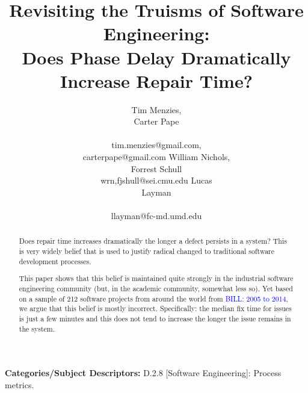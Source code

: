 \documentclass{sig-alternate}
\newcommand{\bill}[1]{\textcolor{blue}{BILL: #1}}
\begin{document}
\title{Revisiting the Truisms of Software Engineering:\\ Does Phase Delay Dramatically Increase  Repair Time?}
\author{
\alignauthor
Tim Menzies, \\Carter Pape\\
       \\
       tim.menzies@gmail.com,\\carterpape@gmail.com
\alignauthor
William Nichols,\\ Forrest Schull\\
wrn,fjshull@sei.cmu.edu
\alignauthor
Lucas \\Layman\\
       \\ 
       llayman@fc-md.umd.edu
} 


 
\maketitle
\begin{abstract}
Does
repair time increases dramatically
the longer a defect persists in a system?
This  is very widely belief that is used to justify 
radical changed to    traditional software development
 processes.

This paper shows that this belief is maintained
quite strongly in the industrial software engineering
community (but, in the academic community, somewhat less so).
Yet based on a sample of 
212 software projects from around the world from 
\bill{2005 to 2014}, we argue that this belief is mostly 
incorrect. Specifically: the median fix time for issues
is just a few minutes and this does not tend to increase
the longer the issue remains in the system. 

\end{abstract}

\vspace{1mm}
\noindent
{\bf Categories/Subject Descriptors:} 
D.2.8 [Software Engineering]: Process metrics.

 
\end{document}
